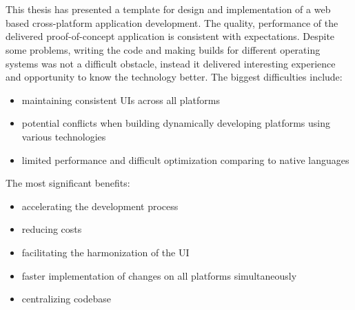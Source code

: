 
\chapter{}%
\label{ch:conclusie}


This thesis has presented a template for design and implementation of a web based cross-platform application development. The quality, performance of the delivered proof-of-concept application is consistent with expectations. 
Despite some problems, writing the code and making builds for different operating systems was not a difficult obstacle, instead it delivered interesting experience and opportunity to know the technology better.
\newline
The biggest difficulties include:
\begin{itemize}
    \item maintaining consistent UIs across all platforms
    \item potential conflicts when building dynamically developing platforms using various technologies
    \item limited performance and difficult optimization comparing to native languages
\end{itemize}

The most significant benefits:
\begin{itemize}
    \item accelerating the development process
    \item reducing costs
    \item facilitating the harmonization of the UI
    \item faster implementation of changes on all platforms simultaneously
    \item centralizing codebase
\end{itemize}

